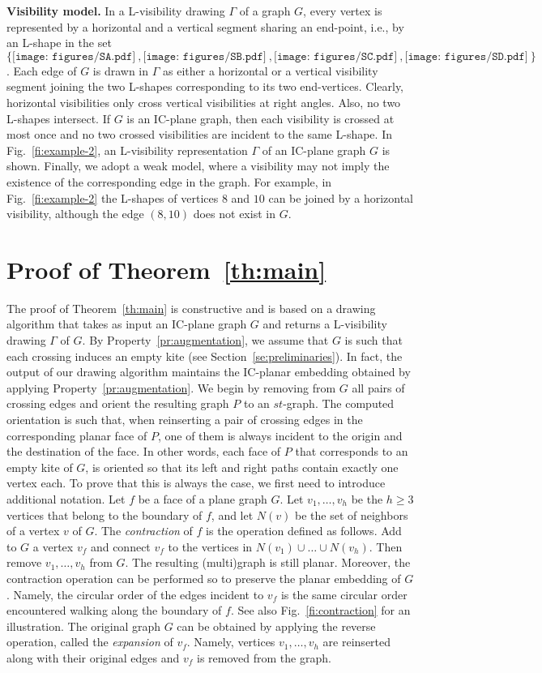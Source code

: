 \documentclass[a4paper]{article}
\newcommand{\SA}{\texttt{[image: figures/SA.pdf]}~}
\newcommand{\SB}{\texttt{[image: figures/SB.pdf]}~}
\newcommand{\SC}{\texttt{[image: figures/SC.pdf]}~}
\newcommand{\SD}{\texttt{[image: figures/SD.pdf]}~}
\newcommand{\shapes}{$\{\SA,\SB,\SC,\SD\}$\xspace}
\begin{document}
{\bf Visibility model.}  In a L-visibility drawing $\Gamma$ of a graph $G$, every vertex is represented by a horizontal and a vertical segment sharing an end-point, i.e., by an L-shape in the set \shapes. Each edge of $G$ is drawn in $\Gamma$ as either a horizontal or a vertical visibility segment joining the two L-shapes corresponding to its two end-vertices. Clearly, horizontal visibilities only cross vertical visibilities at right angles. Also, no two L-shapes intersect. If $G$ is an IC-plane graph, then each visibility is crossed at most once and no two crossed visibilities are incident to the same L-shape. In Fig.~\ref{fi:example-2}, an L-visibility representation $\Gamma$ of an IC-plane graph $G$ is shown.  Finally, we adopt a weak model, where a visibility may not imply the existence of the corresponding edge in the graph. For example, in Fig.~\ref{fi:example-2} the L-shapes of vertices $8$ and $10$ can be joined by a horizontal visibility, although the edge $(8,10)$ does not exist in $G$.



\section{Proof of Theorem~\ref{th:main}}\label{se:proof}

The proof of Theorem~\ref{th:main} is constructive and is based on a drawing algorithm that takes as input an IC-plane graph $G$ and returns a L-visibility drawing $\Gamma$ of $G$. By Property~\ref{pr:augmentation}, we assume that $G$ is such that each crossing induces an empty kite (see Section~\ref{se:preliminaries}). In fact, the output of our drawing algorithm maintains the IC-planar embedding obtained by applying Property~\ref{pr:augmentation}. We begin by removing from $G$ all pairs of crossing edges and orient the resulting graph $P$ to an $st$-graph. The computed orientation is such that, when reinserting a pair of crossing edges in the corresponding planar face of $P$, one of them is always incident to the origin and the destination of the face. In other words, each face of $P$ that corresponds to an empty kite of $G$, is oriented so that its left and right paths contain exactly one vertex each. To prove that this is always the case, we first need to introduce additional notation. Let $f$ be a face of a plane graph $G$.  Let $v_1,\dots,v_h$ be the $h\geq3$ vertices that belong to the boundary of $f$, and let $N(v)$ be the set of neighbors of a vertex $v$ of $G$. The \emph{contraction} of $f$ is the  operation defined as follows. Add to $G$ a vertex $v_f$ and connect $v_f$ to the vertices in $N(v_1) \cup \dots \cup N(v_h)$. Then remove $v_1,\dots,v_h$ from $G$. The resulting (multi)graph is still planar. Moreover, the contraction operation can be performed so to preserve the planar embedding of $G$. Namely, the circular order of the edges incident to $v_f$ is the same circular order encountered walking along the boundary of $f$. See also Fig.~\ref{fi:contraction} for an illustration. The original graph $G$ can be obtained by applying the reverse operation, called the \emph{expansion} of $v_f$. Namely, vertices $v_1,\dots,v_h$ are reinserted along with their original edges and $v_f$ is removed from the graph. 
\end{document}
